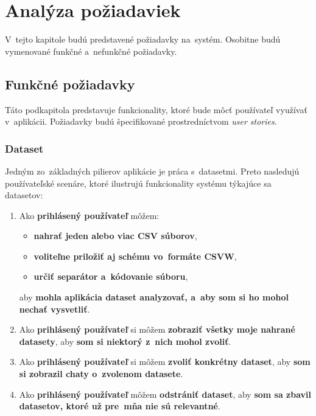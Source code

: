 \chapter{Analýza požiadaviek}
\label{requirements-analysis}

V~tejto kapitole budú predstavené požiadavky na~systém. Osobitne budú vymenované funkčné a~nefunkčné požiadavky.

\section{Funkčné požiadavky}

Táto podkapitola predstavuje funkcionality, ktoré bude môcť používateľ využívať v~aplikácii. Požiadavky budú špecifikované prostredníctvom \textit{user stories}.

\subsection{Dataset}
\label{dataset}

Jedným zo~základných pilierov aplikácie je práca s~datasetmi. Preto nasledujú používateľské scenáre, ktoré ilustrujú funkcionality systému týkajúce sa datasetov:

\begin{enumerate}
\item Ako \textbf{prihlásený používateľ} môžem:
\begin{itemize}
\item \textbf{nahrať jeden alebo viac CSV súborov},
\item \textbf{voliteľne priložiť aj schému vo~formáte CSVW},
\item \textbf{určiť separátor a~kódovanie súboru},
\end{itemize}
aby \textbf{mohla aplikácia dataset analyzovať, a~aby som si ho mohol nechať vysvetliť}.

\item Ako \textbf{prihlásený používateľ} si môžem \textbf{zobraziť všetky moje nahrané datasety}, aby \textbf{som si niektorý z~nich mohol zvoliť}.

\item Ako \textbf{prihlásený používateľ} si môžem \textbf{zvoliť konkrétny dataset}, aby \textbf{som si zobrazil chaty o~zvolenom datasete}.

\item Ako \textbf{prihlásený používateľ} môžem \textbf{odstrániť dataset}, aby \textbf{som sa zbavil datasetov, ktoré už pre~mňa nie sú relevantné}.
\end{enumerate}

